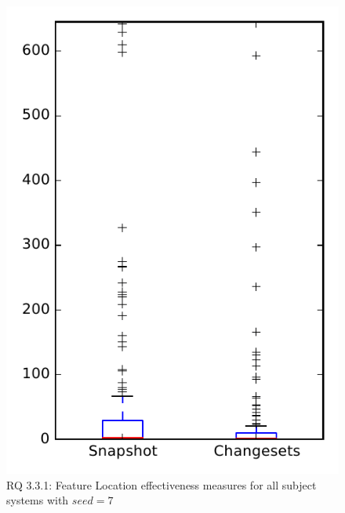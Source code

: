 
\begin{figure}
\centering
\includegraphics[height=0.4\textheight]{figures/flt_seed/rq1_overview_7}
\caption{RQ 3.3.1: Feature Location effectiveness measures for all subject systems with $seed=7$}
\label{fig:flt_seed:rq1:overview}
\end{figure}
